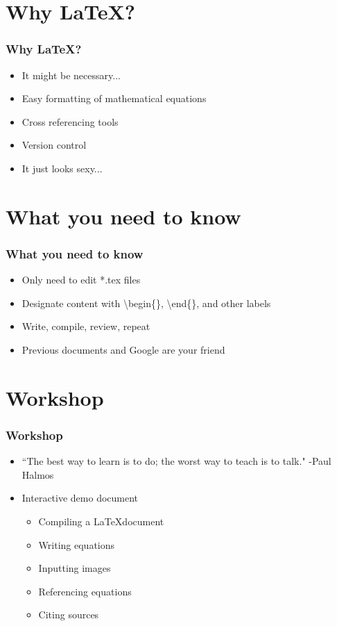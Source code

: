 \documentclass{beamer}
\begin{document}
\section{Why \LaTeX?}
\begin{frame}
	\frametitle{Why \LaTeX?}
    \begin{itemize}
		\item It might be necessary...
        \item Easy formatting of mathematical equations
        \item Cross referencing tools
		\item Version control
        \item It just looks sexy...
    \end{itemize}
\end{frame}

\section{What you need to know}
\begin{frame}
	\frametitle{What you need to know}
	\begin{itemize}
		\item Only need to edit *.tex files
		\item Designate content with \textbackslash begin\{\}, \textbackslash end\{\}, and other labels
		\item Write, compile, review, repeat
		\item Previous documents and Google are your friend
	\end{itemize}
\end{frame}

\section{Workshop}
\begin{frame}
	\frametitle{Workshop}
	\begin{itemize}
		\item ``The best way to learn is to do; the worst way to teach is to talk." -Paul Halmos
		\item Interactive demo document
			\begin{itemize}
				\item Compiling a \LaTeX document
				\item Writing equations
				\item Inputting images
				\item Referencing equations
				\item Citing sources
			\end{itemize}
	\end{itemize}
\end{frame}
\end{document}
